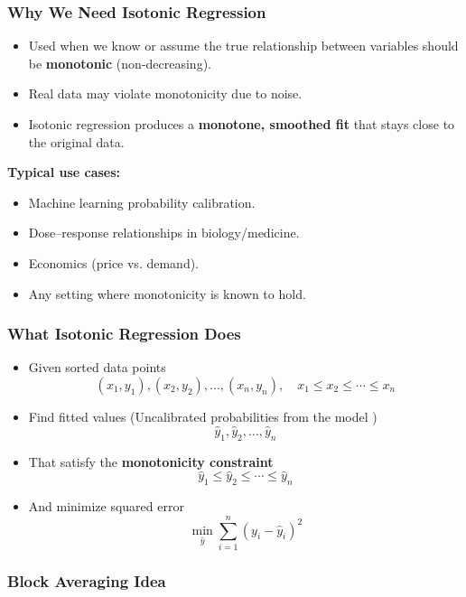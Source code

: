 \documentclass[10pt,a4paper]{article}
\begin{document}
	\subsubsection{Why We Need Isotonic Regression}

	\begin{itemize}
		\item Used when we know or assume the true relationship between variables should be \textbf{monotonic} (non-decreasing).
		\item Real data may violate monotonicity due to noise.
		\item Isotonic regression produces a \textbf{monotone, smoothed fit} that stays close to the original data.
	\end{itemize}

	\textbf{Typical use cases:}
	\begin{itemize}
		\item Machine learning probability calibration.
		\item Dose–response relationships in biology/medicine.
		\item Economics (price vs. demand).
		\item Any setting where monotonicity is known to hold.
	\end{itemize}

	\subsubsection{What Isotonic Regression Does}

	\begin{itemize}
		\item Given sorted data points
		$$ (x_1, y_1), (x_2, y_2), \ldots, (x_n, y_n), \quad x_1 \le x_2 \le \cdots \le x_n $$
		\item Find fitted values (Uncalibrated probabilities from the model )
		$$ \hat{y}_1, \hat{y}_2, \ldots, \hat{y}_n $$
		\item That satisfy the \textbf{monotonicity constraint}
		$$ \hat{y}_1 \le \hat{y}_2 \le \cdots \le \hat{y}_n $$
		\item And minimize squared error
		$$ \min_{\hat{y}} \sum_{i=1}^n (y_i - \hat{y}_i)^2 $$
	\end{itemize}

	\subsubsection{Block Averaging Idea}
\end{document}
